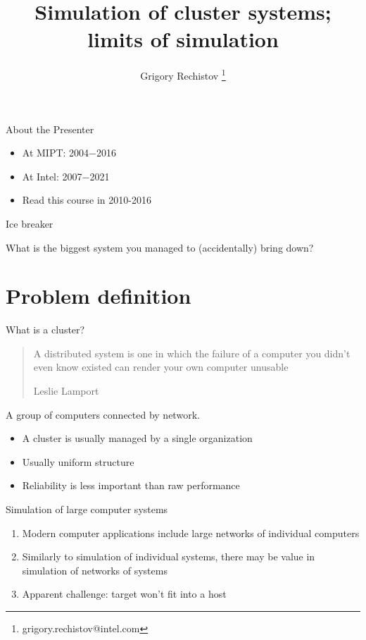 

\author{Grigory Rechistov \thanks{grigory.rechistov@intel.com}}
\title{Simulation of cluster systems; limits of simulation}



\startslides

\begin{frame}{About the Presenter}
\begin{itemize}
\item At MIPT: 2004−2016
\item At Intel: 2007−2021
\item Read this course in 2010-2016
\end{itemize}
\end{frame}

\begin{frame}{Ice breaker}

What is the biggest system you managed to (accidentally) bring down?

\end{frame}


\section{Problem definition}

\begin{frame}{What is a cluster?}

\pause
\begin{quotation}
A distributed system is one in which the failure of a computer you didn't even know existed can render your own computer unusable

Leslie Lamport
\end{quotation}
\pause

A group of computers connected by network.

\begin{itemize}
    \item A cluster is usually managed by a single organization
    \item Usually uniform structure
    \item Reliability is less important than raw performance
\end{itemize}

\end{frame}

\begin{frame}{Simulation of large computer systems}

\begin{enumerate}
    \item Modern computer applications include large networks of individual computers
    \item Similarly to simulation of individual systems, there may be value in simulation of networks of systems
    \item Apparent challenge: target won't fit into a host
\end{enumerate}

\end{frame}


